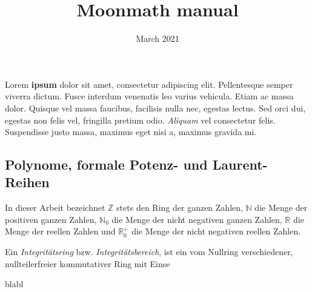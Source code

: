 \documentclass{article}
\title{Moonmath manual}
\author{}
\date{March 2021}
\begin{document}
\maketitle

Lorem \textbf{ipsum} dolor sit amet, consectetur adipiscing elit. Pellentesque semper viverra dictum.  Fusce interdum venenatis leo varius vehicula. Etiam ac massa dolor. Quisque vel massa faucibus, facilisis nulla nec, egestas lectus. Sed orci dui, egestas non felis vel, fringilla pretium odio. \textit{Aliquam} vel consectetur felis. Suspendisse justo massa, maximus eget nisi a, maximus gravida mi.




\subsection{Polynome, formale Potenz- und Laurent-Reihen}

In dieser Arbeit bezeichnet $\mathbb{Z}$ stets den Ring der ganzen Zahlen, $\mathbb{N}$ die Menge der positiven ganzen Zahlen, 
$\mathbb{N}_0$ die Menge der nicht negativen ganzen Zahlen, 
$\mathbb{R}$ die Menge der reellen Zahlen und $\mathbb{R}^+_0$ die Menge
der nicht negativen reellen Zahlen.

Ein \textit{Integritätsring} bzw. \textit{Integritätsbereich}, ist ein vom Nullring verschiedener, nullteilerfreier kommutativer Ring mit Einse

blabl
\end{document}
